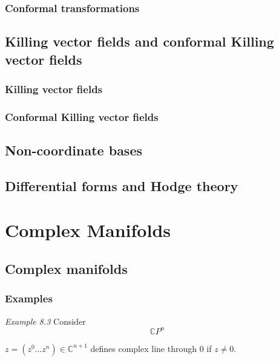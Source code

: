 \documentclass[twoside]{amsart}
\begin{document}
\subsubsection{ Conformal transformations }

\subsection{ Killing vector fields and conformal Killing vector fields }

\subsubsection{ Killing vector fields }

\subsubsection{ Conformal Killing vector fields }

\subsection{ Non-coordinate bases }

\subsection{ Differential forms and Hodge theory }




\section{Complex Manifolds}

\subsection{Complex manifolds }

\subsubsection{}

\subsubsection{Examples}

\emph{Example 8.3}
Consider 
\[
\mathbb{C}P^n
\]

$z=(z^0 \dots z^n) \in \mathbb{C}^{n+1}$ defines complex line through $0$ if $z\neq 0$.
\end{document}
